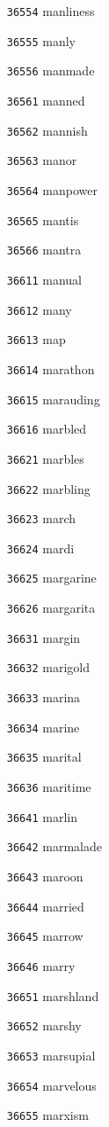 \documentclass[twoside,11pt]{article}
\begin{document}
\begin{multicols}{5}
\begin{enumerate}
\item[\texttt{36554}] manliness
\item[\texttt{36555}] manly
\item[\texttt{36556}] manmade
\item[\texttt{36561}] manned
\item[\texttt{36562}] mannish
\item[\texttt{36563}] manor
\item[\texttt{36564}] manpower
\item[\texttt{36565}] mantis
\item[\texttt{36566}] mantra
\item[\texttt{36611}] manual
\item[\texttt{36612}] many
\item[\texttt{36613}] map
\item[\texttt{36614}] marathon
\item[\texttt{36615}] marauding
\item[\texttt{36616}] marbled
\item[\texttt{36621}] marbles
\item[\texttt{36622}] marbling
\item[\texttt{36623}] march
\item[\texttt{36624}] mardi
\item[\texttt{36625}] margarine
\item[\texttt{36626}] margarita
\item[\texttt{36631}] margin
\item[\texttt{36632}] marigold
\item[\texttt{36633}] marina
\item[\texttt{36634}] marine
\item[\texttt{36635}] marital
\item[\texttt{36636}] maritime
\item[\texttt{36641}] marlin
\item[\texttt{36642}] marmalade
\item[\texttt{36643}] maroon
\item[\texttt{36644}] married
\item[\texttt{36645}] marrow
\item[\texttt{36646}] marry
\item[\texttt{36651}] marshland
\item[\texttt{36652}] marshy
\item[\texttt{36653}] marsupial
\item[\texttt{36654}] marvelous
\item[\texttt{36655}] marxism

\end{enumerate}
\end{multicols}
\end{document}
